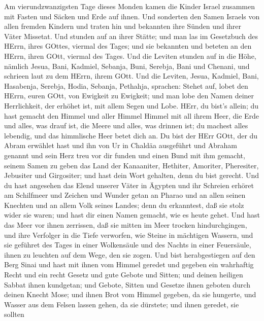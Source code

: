  Am vierundzwanzigsten Tage dieses Monden kamen die Kinder
Israel zusammen mit Fasten und Säcken und Erde auf ihnen. 
Und sonderten den Samen Israels von allen fremden Kindern und traten hin
und bekannten ihre Sünden und ihrer Väter Missetat.  Und
stunden auf an ihrer Stätte; und man las im Gesetzbuch des HErrn, ihres
GOttes, viermal des Tages; und sie bekannten und beteten an den HErrn,
ihren GOtt, viermal des Tages.  Und die Leviten stunden auf
in die Höhe, nämlich Jesua, Bani, Kadmiel, Sebanja, Buni, Serebja, Bani
und Chenani, und schrieen laut zu dem HErrn, ihrem GOtt. 
Und die Leviten, Jesua, Kadmiel, Bani, Hasabenja, Serebja, Hodia,
Sebanja, Pethahja, sprachen: Stehet auf, lobet den HErrn, euren GOtt,
von Ewigkeit zu Ewigkeit; und man lobe den Namen deiner Herrlichkeit,
der erhöhet ist, mit allem Segen und Lobe.  HErr, du bist's
allein; du hast gemacht den Himmel und aller Himmel Himmel mit all ihrem
Heer, die Erde und alles, was drauf ist, die Meere und alles, was
drinnen ist; du machest alles lebendig, und das himmlische Heer betet
dich an.  Du bist der HErr GOtt, der du Abram erwählet hast
und ihn von Ur in Chaldäa ausgeführt und Abraham genannt 
und sein Herz treu vor dir funden und einen Bund mit ihm gemacht, seinem
Samen zu geben das Land der Kanaaniter, Hethiter, Amoriter, Pheresiter,
Jebusiter und Girgositer; und hast dein Wort gehalten, denn du bist
gerecht.  Und du hast angesehen das Elend unserer Väter in
Ägypten und ihr Schreien erhöret am Schilfmeer  und Zeichen
und Wunder getan an Pharao und an allen seinen Knechten und an allem
Volk seines Landes; denn du erkanntest, daß sie stolz wider sie waren;
und hast dir einen Namen gemacht, wie es heute gehet.  Und
hast das Meer vor ihnen zerrissen, daß sie mitten im Meer trocken
hindurchgingen, und ihre Verfolger in die Tiefe verworfen, wie Steine in
mächtigen Wassern,  und sie geführet des Tages in einer
Wolkensäule und des Nachts in einer Feuersäule, ihnen zu leuchten auf
dem Wege, den sie zogen.  Und bist herabgestiegen auf den
Berg Sinai und hast mit ihnen vom Himmel geredet und gegeben ein
wahrhaftig Recht und ein recht Gesetz und gute Gebote und Sitten;
 und deinen heiligen Sabbat ihnen kundgetan; und Gebote,
Sitten und Gesetze ihnen geboten durch deinen Knecht Mose; 
und ihnen Brot vom Himmel gegeben, da sie hungerte, und Wasser aus dem
Felsen lassen gehen, da sie dürstete; und ihnen geredet, sie sollten
